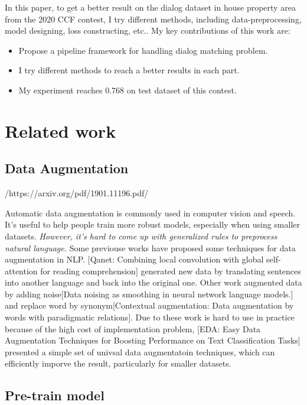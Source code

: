 \documentclass{article}%
\begin{document}
%
In this paper, to get a better result on the dialog dataset in house property area from the 2020 CCF contest, I try different methods, including data{-}preprocessing, model designing, loss constructing, etc.. My key contributions of this work are:%

%
\begin{itemize}%
\item%
Propose a pipeline framework for handling dialog matching problem.%
\item%
I try different methods to reach a better results in each part.%
\item%
My experiment reaches 0.768 on test dataset of this contest.%
\end{itemize}%
%

%

%
\section{Related work}%

%
\subsection{Data Augmentation}%

%
/https://arxiv.org/pdf/1901.11196.pdf/%

%
Automatic data augmentation is commonly used in computer vision and speech. It's useful to help people train more robust models, especially when using smaller datasets. \textit{However, it's hard to come up with generalized rules to preprocess natural language.} Some previouse works have proposed some techniques for data augmentation in NLP. {[}Qanet: Combining local convolution with global self{-}attention for reading comprehension{]} generated new data by translating sentences into another language and back into the original one. Other work augmented data by adding noise{[}Data noising as smoothing in neural network language models.{]} and replace word by synonym{[}Contextual augmentation: Data augmentation by words with paradigmatic relations{]}. Due to these work is hard to use in practice because of the high cost of implementation problem, {[}EDA: Easy Data Augmentation Techniques for Boosting Performance on Text Classification Tasks{]} presented a simple set of univsal data augmentatoin techniques, which can efficiently imporve the result, particularly for smaller datasets.%

%

%
\subsection{Pre{-}train model}%
\end{document}

